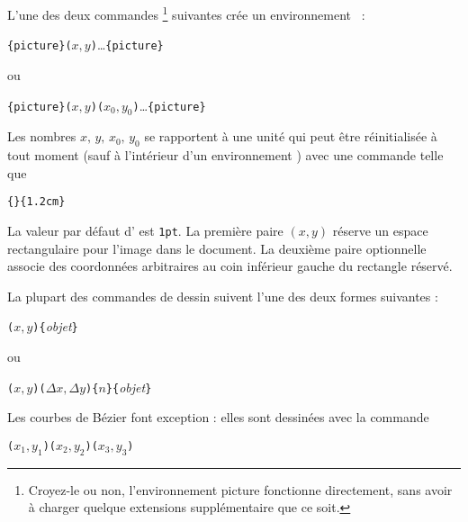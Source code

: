 L'une des deux commandes
\footnote{Croyez-le ou non, l'environnement picture fonctionne
  directement, sans avoir à charger quelque extensions \LaTeXe{}
  supplémentaire que ce soit.}
suivantes crée un environnement ~:
\begin{lscommand}
\verb|{picture}(|$x,y$\verb|)|\ldots{}\verb|{picture}|
\end{lscommand}
\noindent ou
\begin{lscommand}
\verb|{picture}(|$x,y$\verb|)(|$x_0,y_0$\verb|)|\ldots{}\verb|{picture}|
\end{lscommand}
Les nombres $x,\,y,\,x_0,\,y_0$ se rapportent à une unité
 qui peut être réinitialisée à tout moment (sauf à
l'intérieur d'un environnement ) avec une commande telle
que
\begin{lscommand}
\verb|{|\verb|}{1.2cm}|
\end{lscommand}
La valeur par défaut d' est \texttt{1pt}. La première
paire $(x,y)$ réserve un espace rectangulaire pour l'image dans le
document. La deuxième paire optionnelle associe des coordonnées
arbitraires au coin inférieur gauche du rectangle réservé.

La plupart des commandes de dessin suivent l'une des deux formes
suivantes :
\begin{lscommand}
\verb|(|$x,y$\verb|){|\emph{objet}\verb|}|
\end{lscommand}
\noindent ou
\begin{lscommand}
\verb|(|$x,y$\verb|)(|$\Delta x,\Delta y$\verb|){|$n$\verb|}{|\emph{objet}\verb|}|
\end{lscommand}
Les courbes de B\'ezier font exception : elles sont dessinées avec la
commande
\begin{lscommand}
\verb|(|$x_1,y_1$\verb|)(|$x_2,y_2$\verb|)(|$x_3,y_3$\verb|)|
\end{lscommand}

